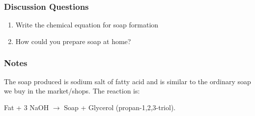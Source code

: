 \subsubsection*{Discussion Questions}
\begin{enumerate}
\item{Write the chemical equation for soap formation}
\item{How could you prepare soap at home?}
\end{enumerate}

\subsubsection*{Notes}
The soap produced is sodium salt of fatty acid and is similar to the ordinary soap we buy in the market/shops.
The reaction is:

Fat  +  3 NaOH  $\longrightarrow$ Soap  +  Glycerol (propan-1,2,3-triol).

